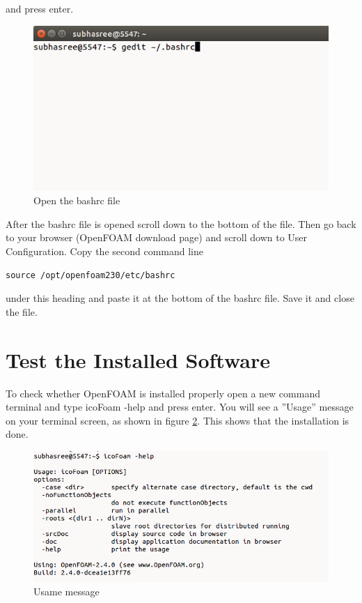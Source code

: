 \documentclass[a4paper,12pt]{report}
\begin{document}
\flushleft and press enter.

\begin{figure}[ht]  
\begin{center}  
\includegraphics[scale=0.4]{7.png}
\caption{Open the bashrc file}
\label{7}
\end{center}  
\end{figure}

\flushleft After the bashrc file is opened scroll down to the bottom of the file. Then go back to your browser (OpenFOAM download page) and scroll down to User Configuration.
\flushleft Copy the second command line
\begin{lstlisting}[frame=single]
source /opt/openfoam230/etc/bashrc 
\end{lstlisting}
\flushleft under this heading and paste it at the bottom of the bashrc file. Save it and close the file.

\section{Test the Installed Software}
\flushleft To check whether OpenFOAM is installed properly open a new command terminal and  type icoFoam -help and press enter. You will see a ”Usage” message on your terminal screen, as shown in figure \ref{8}. This shows that the installation is done.

\begin{figure}[ht]  
\begin{center}  
\includegraphics[scale=0.5]{8.png}
\caption{Usame message}
\label{8}
\end{center}  
\end{figure}
\end{document}
